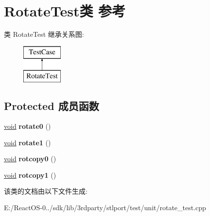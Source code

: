 \hypertarget{class_rotate_test}{}\section{Rotate\+Test类 参考}
\label{class_rotate_test}
类 Rotate\+Test 继承关系图\+:\begin{figure}[H]
\begin{center}
\leavevmode
\includegraphics[height=2.000000cm]{class_rotate_test}
\end{center}
\end{figure}
\subsection*{Protected 成员函数}
\begin{DoxyCompactItemize}
\item 
\mbox{\label{class_rotate_test_a2ff326c6e29f7ed7a4be4eeb5c79e717}} 
\hyperlink{interfacevoid}{void} {\bfseries rotate0} ()
\item 
\mbox{\label{class_rotate_test_af1fd55e35ed2c10b51bfd26ec5ca5375}} 
\hyperlink{interfacevoid}{void} {\bfseries rotate1} ()
\item 
\mbox{\label{class_rotate_test_aa23cd26479995e72386d6edf34c03b22}} 
\hyperlink{interfacevoid}{void} {\bfseries rotcopy0} ()
\item 
\mbox{\label{class_rotate_test_a640d8f37d7c28f09e7a3fb95b19cd10f}} 
\hyperlink{interfacevoid}{void} {\bfseries rotcopy1} ()
\end{DoxyCompactItemize}


该类的文档由以下文件生成\+:\begin{DoxyCompactItemize}
\item 
E\+:/\+React\+O\+S-\/0../sdk/lib/3rdparty/stlport/test/unit/rotate\+\_\+test.\+cpp\end{DoxyCompactItemize}
